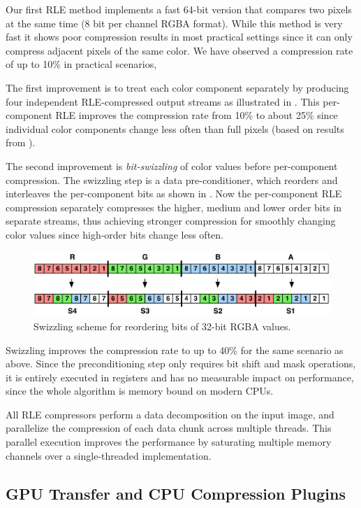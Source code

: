 Our first RLE method implements a fast 64-bit version that compares two pixels
at the same time (8 bit per channel RGBA format). While this method is very
fast it shows poor compression results in most practical settings since it can
only compress adjacent pixels of the same color. We have observed a compression
rate of up to 10\% in practical scenarios,

The first improvement is to treat each color component separately by producing
four independent RLE-compressed output streams as illustrated in .
This per-component RLE improves the compression rate from 10\% to about 25\%
since individual color components change less often than full pixels (based on
results from \cite{MEP:10}).

The second improvement is {\em bit-swizzling} of color values before
per-component compression. The swizzling step is a data pre-conditioner, which
reorders and interleaves the per-component bits as shown in . Now
the per-component RLE compression separately compresses the higher, medium and
lower order bits in separate streams, thus achieving stronger compression for
smoothly changing color values since high-order bits change less often.

\begin{figure}[h!t]
  \centering
  \includegraphics[width=\textwidth]{images/swizzle}
  \caption{Swizzling scheme for reordering bits of 32-bit RGBA values.}
  \label{fSwizzle}
\end{figure}

Swizzling improves the compression rate to up to 40\% for the same scenario as
above. Since the preconditioning step only requires bit shift and mask
operations, it is entirely executed in registers and has no measurable
impact on performance, since the whole algorithm is memory bound on modern CPUs.

All RLE compressors perform a data decomposition on the input image, and
parallelize the compression of each data chunk across multiple threads. This
parallel execution improves the performance by saturating multiple memory
channels over a single-threaded implementation.

\subsection{GPU Transfer and CPU Compression Plugins}

